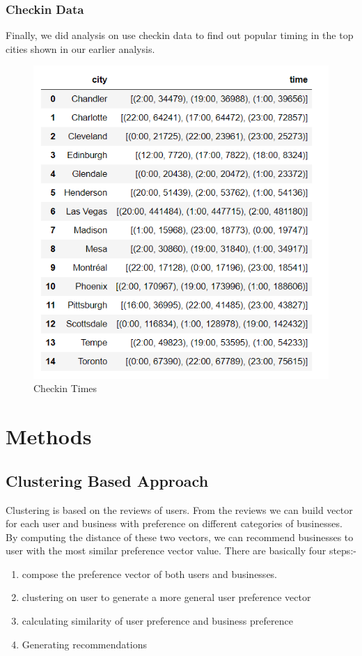 \documentclass[11pt]{article}
\begin{document}
 	\subsubsection{Checkin Data}
 	Finally, we did analysis on use checkin data to find out popular timing in the top cities shown in our earlier analysis.
 
      \begin{figure}[h]
 		\centering
 		\includegraphics[scale=0.5] {checkin_times.png}
 		\caption{Checkin Times}
 	\end{figure}
 	
	\section{Methods}
		
		\subsection{Clustering Based Approach}
		Clustering is based on the reviews of users. From the reviews we can build vector for each user and business with preference on different categories of businesses. By computing the distance of these two vectors, we can recommend businesses to user with the most similar preference vector value.
		There are basically four steps:- 
		\begin{enumerate}
			\item  compose the preference vector of both users and businesses.
			\item  clustering on user to generate a more general user preference vector
			\item  calculating similarity of user preference and business preference
			\item  Generating recommendations
		\end{enumerate}
		
\end{document}
